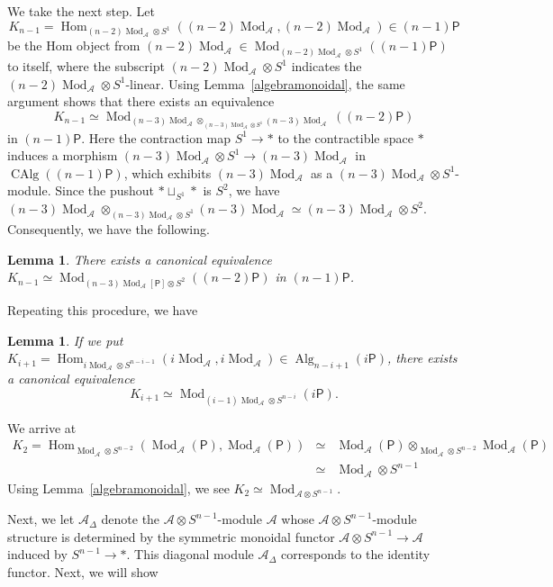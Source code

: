 \documentclass[leqno,12pt]{amsart}
\theoremstyle{plain}
\newtheorem{Lemma}[Theorem]{Lemma}
\theoremstyle{definition}
\newcommand{\AAA}{\mathcal{A}}
\newcommand{\Hom}{\operatorname{Hom}}
\newcommand{\Mod}{\operatorname{Mod}}
\newcommand{\Alg}{\operatorname{Alg}}
\newcommand{\CAlg}{\operatorname{CAlg}}
\begin{document}
We take the next step.
Let 
\[
K_{n-1}=\Hom_{(n-2)\Mod_{\AAA}\otimes S^1}((n-2)\Mod_{\AAA}, (n-2)\Mod_{\AAA}) \in (n-1)\mathsf{P}
\]
be the Hom object from $(n-2)\Mod_{\AAA}\in \Mod_{(n-2)\Mod_{\AAA}\otimes S^1}((n-1)\mathsf{P})$ to
itself, where the subscript $(n-2)\Mod_{\AAA}\otimes S^1$  indicates the $(n-2)\Mod_{\AAA}\otimes S^1$-linear.
Using Lemma~\ref{algebramonoidal}, the same argument shows that there exists an equivalence
\[
K_{n-1}\simeq \Mod_{(n-3)\Mod_{\AAA}\otimes_{(n-3)\Mod_{\AAA}\otimes S^1}(n-3)\Mod_{\AAA}}((n-2)\mathsf{P})
\]
in $(n-1)\mathsf{P}$. Here the contraction map $S^1\to \ast$ to the contractible space $\ast$
induces a morphism $(n-3)\Mod_{\AAA}\otimes S^1\to (n-3)\Mod_{\AAA}$ in $\CAlg((n-1)\mathsf{P})$,
which exhibits $(n-3)\Mod_{\AAA}$ as a $(n-3)\Mod_{\AAA}\otimes S^1$-module.
Since the pushout $\ast\sqcup_{S^1}\ast$ is $S^2$, we have $(n-3)\Mod_{\AAA}\otimes_{(n-3)\Mod_{\AAA}\otimes S^1}(n-3)\Mod_{\AAA}\simeq (n-3)\Mod_{\AAA}\otimes S^2$.
Consequently, we have the following.
\begin{Lemma}
There exists a canonical equivalence $K_{n-1}\simeq \Mod_{(n-3)\Mod_{\AAA}[\mathsf{P}]\otimes S^2}((n-2)\mathsf{P})$ in $(n-1)\mathsf{P}$.
\end{Lemma}


Repeating this procedure, we have

\begin{Lemma}
\label{kirep}
If we 
put $K_{i+1}=\Hom_{i\Mod_{\AAA}\otimes S^{n-i-1}}(i\Mod_{\AAA}, i\Mod_{\AAA})\in \Alg_{n-i+1}(i\mathsf{P})$, there exists a canonical equivalence
\[
K_{i+1}\simeq \Mod_{(i-1)\Mod_{\AAA}\otimes S^{n-i}}(i\mathsf{P}).
\]
\end{Lemma}

We arrive at 
\begin{eqnarray*}
K_2=\Hom_{\Mod_{\AAA}\otimes S^{n-2}}(\Mod_{\AAA}(\mathsf{P}), \Mod_{\AAA}(\mathsf{P})) &\simeq& \Mod_{\AAA}(\mathsf{P})\otimes_{\Mod_{\AAA}\otimes S^{n-2}}\Mod_{\AAA}(\mathsf{P})  \\
&\simeq& \Mod_{\AAA}\otimes S^{n-1}
\end{eqnarray*}
Using Lemma~\ref{algebramonoidal}, we see $K_2\simeq \Mod_{\AAA\otimes S^{n-1}}$.

Next, we let $\AAA_{\Delta}$ denote the $\AAA\otimes S^{n-1}$-module
$\AAA$ whose $\AAA\otimes S^{n-1}$-module structure is determined by
the symmetric monoidal functor $\AAA\otimes S^{n-1}\to \AAA$ induced by $S^{n-1}\to\ast$.
This diagonal module $\AAA_{\Delta}$ corresponds to the identity functor.
Next, we will show
\end{document}
